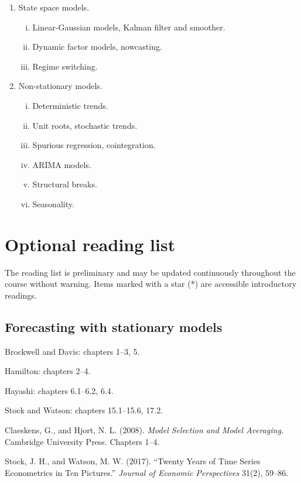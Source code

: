 \documentclass[12pt]{article}
\begin{document}
\begin{enumerate}
\item State space models.
	\begin{enumerate}[i)]
	\item Linear-Gaussian models, Kalman filter and smoother.
	\item Dynamic factor models, nowcasting.
	\item Regime switching.
	\end{enumerate}
\item Non-stationary models.
	\begin{enumerate}[i)]
	\item Deterministic trends.
	\item Unit roots, stochastic trends.
	\item Spurious regression, cointegration.
	\item ARIMA models.
	\item Structural breaks.
	\item Seasonality.
	\end{enumerate}
\end{enumerate}

\clearpage

\section*{Optional reading list}
The reading list is preliminary and may be updated continuously throughout the course without warning. Items marked with a star (*) are accessible introductory readings.

\subsection{Forecasting with stationary models}
\begin{description}
\item Brockwell and Davis: chapters 1--3, 5.
\item Hamilton: chapters 2--4.
\item Hayashi: chapters 6.1--6.2, 6.4.
\item[*] Stock and Watson: chapters 15.1--15.6, 17.2.
\item Claeskens, G., and Hjort, N. L. (2008). \emph{Model Selection and Model Averaging}. Cambridge University Press. Chapters 1--4.
\item[*] Stock, J. H., and Watson, M. W. (2017). ``Twenty Years of Time Series Econometrics in Ten Pictures.'' \emph{Journal of Economic Perspectives} 31(2), 59--86.
\end{description}
\end{document}
